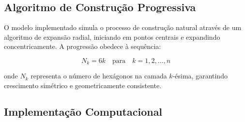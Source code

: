 \documentclass[12pt,a4paper,oneside]{extarticle}
\begin{document}
\subsection{Algoritmo de Construção Progressiva}
O modelo implementado simula o processo de construção natural através de um algoritmo de expansão radial, iniciando em pontos centrais e expandindo concentricamente. A progressão obedece à sequência:

\begin{equation}
N_k = 6k \quad \text{para} \quad k = 1, 2, \ldots, n
\label{eq:progressive_growth}
\end{equation}

onde $N_k$ representa o número de hexágonos na camada $k$-ésima, garantindo crescimento simétrico e geometricamente consistente.

\subsection{Implementação Computacional}
\end{document}
